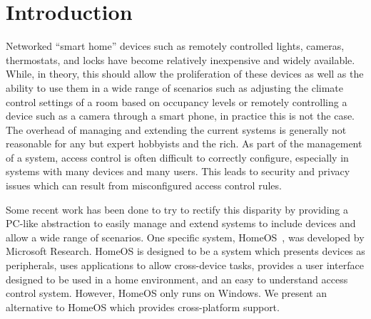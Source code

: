 \section{Introduction}
\label{sec:intro}
Networked ``smart home'' devices such as remotely controlled lights, cameras,
thermostats, and locks have become relatively inexpensive and widely available.
While, in theory, this should allow the proliferation of these devices as well
as the ability to use them in a wide range of scenarios such as adjusting the
climate control settings of a room based on occupancy levels or remotely
controlling a device such as a camera through a smart phone, in practice this is
not the case. The overhead of managing and extending the current systems is
generally not reasonable for any but expert hobbyists and the rich. As part of
the management of a system, access control is often difficult to correctly
configure, especially in systems with many devices and many users. This leads to
security and privacy issues which can result from misconfigured access control
rules.

Some recent work has been done to try to rectify this disparity by providing a
PC-like abstraction to easily manage and extend systems to include devices and
allow a wide range of scenarios. One specific system, HomeOS~\cite{homeOS}, was
developed by Microsoft Research. HomeOS is designed to be a system which
presents devices as peripherals, uses applications to allow cross-device tasks,
provides a user interface designed to be used in a home environment, and an easy
to understand access control system. However, HomeOS only runs on Windows. We
present an alternative to HomeOS which provides cross-platform support.